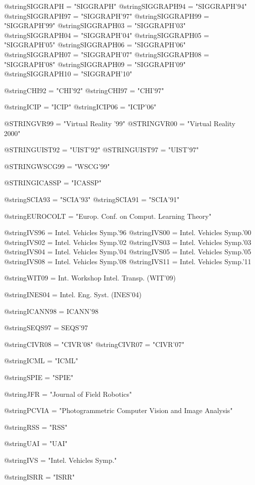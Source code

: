 @string{SIGGRAPH   = "SIGGRAPH"}
@string{SIGGRAPH94 = "SIGGRAPH'94"}
@string{SIGGRAPH97 = "SIGGRAPH'97"}
@string{SIGGRAPH99 = "SIGGRAPH'99"}
@string{SIGGRAPH03 = "SIGGRAPH'03"}
@string{SIGGRAPH04 = "SIGGRAPH'04"}
@string{SIGGRAPH05 = "SIGGRAPH'05"}
@string{SIGGRAPH06 = "SIGGRAPH'06"}
@string{SIGGRAPH07 = "SIGGRAPH'07"}
@string{SIGGRAPH08 = "SIGGRAPH'08"}
@string{SIGGRAPH09 = "SIGGRAPH'09"}
@string{SIGGRAPH10 = "SIGGRAPH'10"}

@string{CHI92 = "CHI'92"}
@string{CHI97 = "CHI'97"}

@string{ICIP   = "ICIP"}
@string{ICIP06 = "ICIP'06"}

@STRING{VR99  = "Virtual Reality '99"}
@STRING{VR00  = "Virtual Reality 2000"}

@STRING{UIST92 = "UIST'92"}
@STRING{UIST97 = "UIST'97"}

@STRING{WSCG99 = "WSCG'99"}

@STRING{ICASSP = "ICASSP"}

@string{SCIA93 = "SCIA'93"}
@string{SCIA91 = "SCIA'91"}

@string{EUROCOLT = "Europ. Conf. on Comput. Learning Theory"}

@string{IVS96 = {Intel. Vehicles Symp.'96}}
@string{IVS00 = {Intel. Vehicles Symp.'00}}
@string{IVS02 = {Intel. Vehicles Symp.'02}}
@string{IVS03 = {Intel. Vehicles Symp.'03}}
@string{IVS04 = {Intel. Vehicles Symp.'04}}
@string{IVS05 = {Intel. Vehicles Symp.'05}}
@string{IVS08 = {Intel. Vehicles Symp.'08}}
@string{IVS11 = {Intel. Vehicles Symp.'11}}

@string{WIT09 = {Int. Workshop Intel. Transp. (WIT'09)}}

@string{INES04 = {Intel. Eng. Syst. (INES'04)}}

@string{ICANN98 = {ICANN'98}}


@string{SEQS97 = {SEQS'97}}

@string{CIVR08 = "CIVR'08"}
@string{CIVR07 = "CIVR'07"}

@string{ICML = "ICML"}

@string{SPIE = "SPIE"}

@string{JFR = "Journal of Field Robotics"}

@string{PCVIA = "Photogrammetric Computer Vision and Image Analysis"}

@string{RSS = "RSS"}

@string{UAI = "UAI"}

@string{IVS = "Intel. Vehicles Symp."}

@string{ISRR = "ISRR"}

